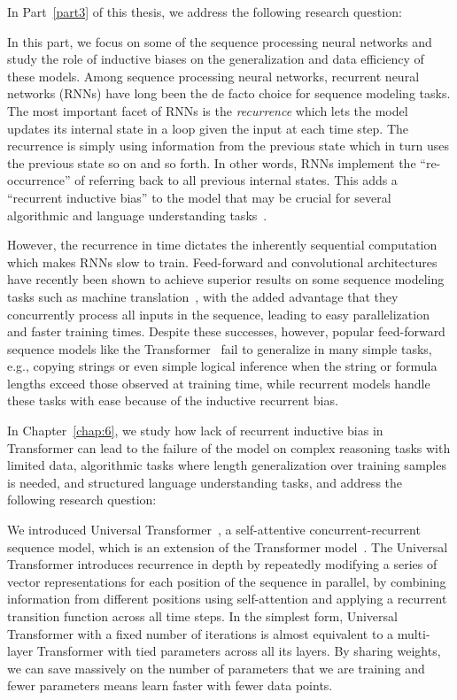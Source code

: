 In Part~\ref{part3} of this thesis, we address the following research question:

In this part, we focus on some of the sequence processing neural networks and study the role of inductive biases on the generalization and data efficiency of these models. 
Among sequence processing neural networks, recurrent neural networks (RNNs) have long been the de facto choice for sequence modeling tasks. The most important facet of RNNs is the \emph{recurrence} which lets the model updates its internal state in a loop given the input at each time step. The recurrence is simply using information from the previous state which in turn uses the previous state so on and so forth.  In other words, RNNs implement the ``re-occurrence'' of referring back to all previous internal states. This adds a ``recurrent inductive bias'' to the model that may be crucial for several algorithmic and language understanding tasks~\cite{tran2016recurrent,Dehghani:ICLR:2019}.

However, the recurrence in time dictates the inherently sequential computation which makes RNNs slow to train. Feed-forward and convolutional architectures have recently been shown to achieve superior results on some sequence modeling tasks such as machine translation~\citep{vaswani2017attention, NalBytenet2017}, with the added advantage that they concurrently process all inputs in the sequence, leading to easy parallelization and faster training times. Despite these successes, however, popular feed-forward sequence models like the Transformer~\citep{vaswani2017attention} fail to generalize in many simple tasks, e.g., copying strings or even simple logical inference when the string or formula lengths exceed those observed at training time, while recurrent models handle these tasks with ease because of the inductive recurrent bias.

In Chapter~\ref{chap:6}, we study how lack of recurrent inductive bias in Transformer can lead to the failure of the model on complex reasoning tasks with limited data, algorithmic tasks where length generalization over training samples is needed, and structured language understanding tasks, and address the following research question:

We introduced Universal Transformer~\citep{Dehghani:ICLR:2019}, a self-attentive concurrent-recurrent sequence model, which is an extension of the Transformer model~\citep{vaswani2017attention}. The Universal Transformer introduces recurrence in depth by repeatedly modifying a series of vector representations for each position of the sequence in parallel, by combining information from different positions using self-attention and applying a recurrent transition function across all time steps. 
In the simplest form, Universal Transformer with a fixed number of iterations is almost equivalent to a multi-layer Transformer with tied parameters across all its layers. By sharing weights, we can save massively on the number of parameters that we are training and fewer parameters means learn faster with fewer data points. 

